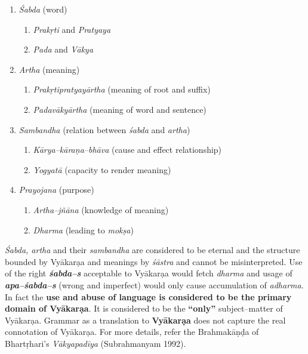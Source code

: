 \begin{enumerate}
\itemsep=0pt
\item \textit{Śabda} (word)
 
\begin{enumerate}
\itemsep=0pt
\item \textit{Prakṛti} and \textit{Pratyaya}

 \item \textit{Pada} and \textit{Vākya}
\end{enumerate}

 \item \textit{Artha} (meaning)
 
\begin{enumerate}
\itemsep=0pt
\item \textit{Prakṛtipratyayārtha} (meaning of root and suffix)

 \item \textit{Padavākyārtha} (meaning of word and sentence) 
\end{enumerate}

 \item \textit{Sambandha} (relation between \textit{śabda} and \textit{artha})
 
\begin{enumerate}
\itemsep=0pt
\item \textit{Kārya–kāraṇa–bhāva} (cause and effect relationship)

 \item \textit{Yogyatā} (capacity to render meaning)
\end{enumerate}

 \item \textit{Prayojana} (purpose)
 
\begin{enumerate}
\itemsep=0pt
\item \textit{Artha–jñāna} (knowledge of meaning)

 \item \textit{Dharma} (leading to \textit{mokṣa})
\end{enumerate}

\end{enumerate}

\textit{Śabda, artha} and their \textit{sambandha} are considered to be eternal and the structure bounded by Vyākarạa and meanings by \textit{śāstra} and cannot be misinterpreted. Use of the right \textbf{\textit{śabda–s}} acceptable to Vyākarạa would fetch \textit{dharma} and usage of \textbf{\textit{apa–śabda–s}} (wrong and imperfect) would only cause accumulation of \textit{adharma}. In fact the \textbf{use and abuse of language is considered to be the primary domain of Vyākarạa}. It is considered to be the \textbf{“only”} subject–matter of Vyākarạa. Grammar as a translation to \textbf{Vyākarạa} does not capture the real connotation of Vyākarạa. For more details, refer the Brahmakāṇḍa of Bhartṛhari’s \textit{Vākyapadīya} (Subrahmanyam 1992).

